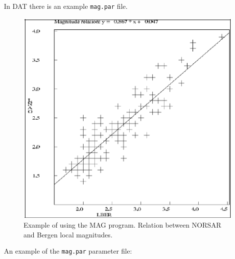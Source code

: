 In DAT there is an example \texttt{mag.par} file. 

\begin{figure}
\centerline{\includegraphics[width=0.9\linewidth]{fig/fig44}}
\caption{Example of using the MAG program. 
Relation between NORSAR and Bergen local magnitudes.}
\end{figure}

An example of the \texttt{mag.par} parameter file: 



